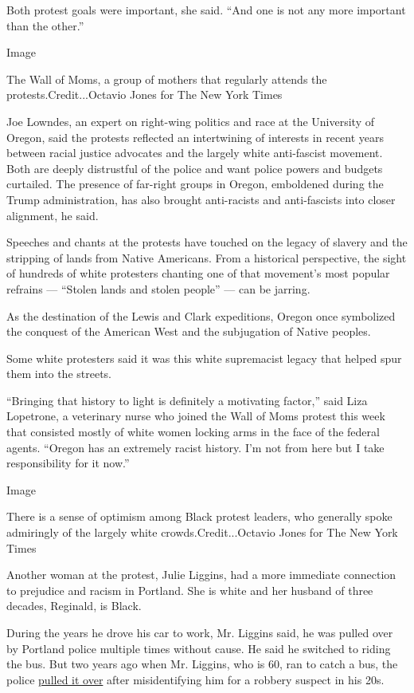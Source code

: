 Both protest goals were important, she said. ``And one is not any more
important than the other.''

Image

The Wall of Moms, a group of mothers that regularly attends the
protests.Credit...Octavio Jones for The New York Times

Joe Lowndes, an expert on right-wing politics and race at the University
of Oregon, said the protests reflected an intertwining of interests in
recent years between racial justice advocates and the largely white
anti-fascist movement. Both are deeply distrustful of the police and
want police powers and budgets curtailed. The presence of far-right
groups in Oregon, emboldened during the Trump administration, has also
brought anti-racists and anti-fascists into closer alignment, he said.

Speeches and chants at the protests have touched on the legacy of
slavery and the stripping of lands from Native Americans. From a
historical perspective, the sight of hundreds of white protesters
chanting one of that movement's most popular refrains --- ``Stolen lands
and stolen people'' --- can be jarring.

As the destination of the Lewis and Clark expeditions, Oregon once
symbolized the conquest of the American West and the subjugation of
Native peoples.

Some white protesters said it was this white supremacist legacy that
helped spur them into the streets.

``Bringing that history to light is definitely a motivating factor,''
said Liza Lopetrone, a veterinary nurse who joined the Wall of Moms
protest this week that consisted mostly of white women locking arms in
the face of the federal agents. ``Oregon has an extremely racist
history. I'm not from here but I take responsibility for it now.''

Image

There is a sense of optimism among Black protest leaders, who generally
spoke admiringly of the largely white crowds.Credit...Octavio Jones for
The New York Times

Another woman at the protest, Julie Liggins, had a more immediate
connection to prejudice and racism in Portland. She is white and her
husband of three decades, Reginald, is Black.

During the years he drove his car to work, Mr. Liggins said, he was
pulled over by Portland police multiple times without cause. He said he
switched to riding the bus. But two years ago when Mr. Liggins, who is
60, ran to catch a bus, the police
\href{https://katu.com/news/local/beaverton-police-launch-investigation-into-possible-case-of-racial-profiling-reggie-liggins}{pulled
it over} after misidentifying him for a robbery suspect in his 20s.


